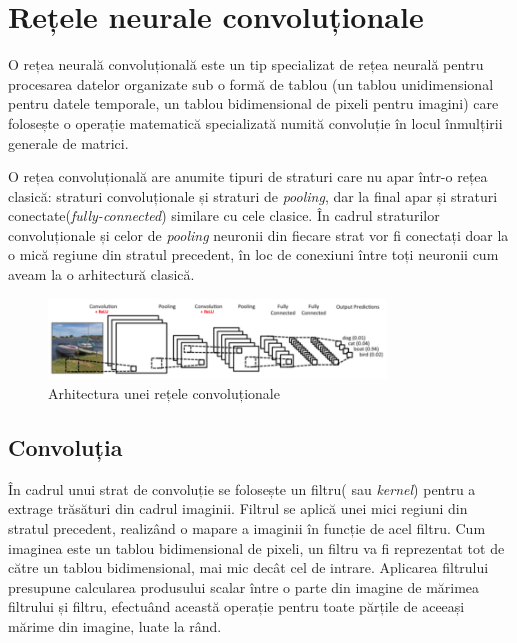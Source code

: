 \section{Rețele neurale convoluționale}
 O rețea neurală convoluțională este un tip specializat de rețea neurală pentru procesarea datelor organizate sub o formă de tablou (un tablou unidimensional pentru datele temporale, un tablou bidimensional de pixeli pentru imagini) care folosește o operație matematică specializată numită convoluție în locul înmulțirii generale de matrici.\cite{Goodfellow-et-al-2016}
 
 O rețea convoluțională are anumite tipuri de straturi care nu apar într-o rețea clasică: straturi convoluționale și straturi de \textit{pooling}, dar la final apar și straturi conectate(\textit{fully-connected}) similare cu cele clasice.  În cadrul straturilor convoluționale și celor de \textit{pooling} neuronii din fiecare strat vor fi conectați doar la o mică regiune din stratul precedent, în loc de conexiuni între toți neuronii cum aveam la o arhitectură clasică.
 
 \begin{figure}[!htbp]
    \begin{center}
        \includegraphics[width=0.8\textwidth]{images/convolutional_network.png}
        \caption{Arhitectura unei rețele convoluționale\cite{intuitive-explanation-conv}}
    \end{center}
\end{figure}

\subsection{Convoluția}
 În cadrul unui strat de convoluție se folosește un filtru( sau \textit{kernel}) pentru a extrage trăsături din cadrul imaginii. Filtrul se aplică unei mici regiuni din stratul precedent, realizând o mapare a imaginii în funcție de acel filtru. Cum imaginea este un tablou bidimensional de pixeli, un filtru va fi reprezentat tot de către un tablou bidimensional, mai mic decât cel de intrare. Aplicarea filtrului presupune calcularea produsului scalar între o parte din imagine de mărimea filtrului și filtru, efectuând această operație pentru toate părțile de aceeași mărime din imagine, luate la rând.
 
